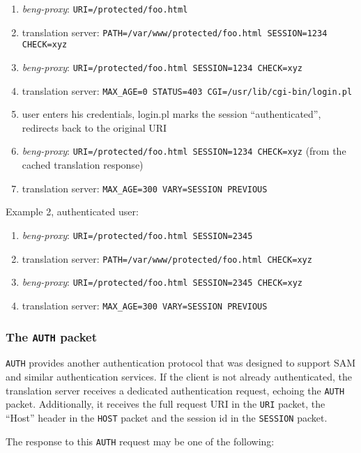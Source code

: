\documentclass[a4paper,12pt]{article}
\begin{document}
\begin{enumerate}
\item \emph{beng-proxy}: \texttt{URI=/protected/foo.html}
\item translation server: \texttt{PATH=/var/www/protected/foo.html
  SESSION=1234 CHECK=xyz}
\item \emph{beng-proxy}: \texttt{URI=/protected/foo.html SESSION=1234
  CHECK=xyz}
\item translation server: \texttt{MAX\_AGE=0 STATUS=403
  CGI=/usr/lib/cgi-bin/login.pl}
\item user enters his credentials, login.pl marks the session
  ``authenticated'', redirects back to the original URI
\item \emph{beng-proxy}: \texttt{URI=/protected/foo.html SESSION=1234
  CHECK=xyz} (from the cached translation response)
\item translation server: \texttt{MAX\_AGE=300 VARY=SESSION PREVIOUS}
\end{enumerate}

Example 2, authenticated user:

\begin{enumerate}
\item \emph{beng-proxy}: \texttt{URI=/protected/foo.html SESSION=2345}
\item translation server: \texttt{PATH=/var/www/protected/foo.html
  CHECK=xyz}
\item \emph{beng-proxy}: \texttt{URI=/protected/foo.html SESSION=2345
  CHECK=xyz}
\item translation server: \texttt{MAX\_AGE=300 VARY=SESSION PREVIOUS}
\end{enumerate}


\subsubsection{The \texttt{AUTH} packet}
\label{auth}

\texttt{AUTH} provides another authentication protocol that was
designed to support SAM and similar authentication services.  If the
client is not already authenticated, the translation server receives a
dedicated authentication request, echoing the \texttt{AUTH} packet.
Additionally, it receives the full request URI in the \texttt{URI}
packet, the ``Host'' header in the \texttt{HOST} packet and the
session id in the \texttt{SESSION} packet.

The response to this \texttt{AUTH} request may be one of the
following:
\end{document}
